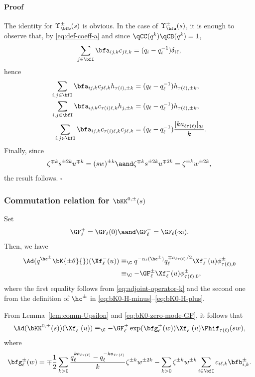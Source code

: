 \documentclass[reqno]{amsart}
\numberwithin{equation}{section}
\newenvironment{pf}{\medskip\paragraph{{\sc Proof}}}{\hfill$\square$\par\medskip}
\begin{document}
\begin{pf}
The identity for $\Upsilon_{\bfb}^\pm(s)$ is obvious. In the case of $\Upsilon_{\bfa}^\pm(s)$, 
it is enough to observe that, by \eqref{eq:def-coeff-a} and since $\qCC(q^k)\qCB(q^k)=1$, 
\begin{equation}\label{eq:basic-contraction-a-c}
\sum_{j\in\bfI}\bfa_{ij,k}c_{j\ell,k}
=(q_i-q_i^{-1})\delta_{i\ell},
\end{equation}
hence
\begin{align}
\sum_{i,j\in\bfI}
\bfa_{ij,k}c_{j\ell,k}h_{\tau(i),\pm k}
&=(q_\ell-q_\ell^{-1})h_{\tau(\ell),\pm k},
\label{eq:contraction-a-c-1}\\
\sum_{i,j\in\bfI}
\bfa_{ij,k}c_{\tau(i)\ell,k}h_{j,\pm k}
&=(q_\ell-q_\ell^{-1})h_{\tau(\ell),\pm k},
\label{eq:contraction-a-c-2}\\
\sum_{i,j\in\bfI}
\bfa_{ij,k}c_{\tau(i)\ell,k}c_{j\ell,k}
&=
(q_\ell-q_\ell^{-1})\frac{[ka_{\ell\tau(\ell)}]_{q_\ell}}{k}.
\label{eq:contraction-a-c-3}
\end{align}
Finally, since 
\[\zeta^{\mp k}s^{\pm 2k}u^{\mp k}
=(sw)^{\pm k}\aand\zeta^{\mp k}s^{\pm2k}u^{\mp2k}
=\zeta^{\pm k}w^{\pm 2k},\] 
the result follows.
\end{pf}

\subsubsection{Commutation relation for $\bKK^{0,\pm}(s)$}\label{sss:bK0-int-4}
Set
\[
\GF_\ell^+=\GF_\ell(0)\aand \GF_\ell^-=\GF_\ell(\infty).
\]
Then, we have
\begin{equation}\label{eq:bK0-zero-mode-GF}
\begin{aligned}
\Ad(q^{\hc^\pm}\bK{\pm\theta}{})
(\Xf^-_\ell(u))
&\equiv_{\C}
q^{-\alpha_\ell(\hc^\pm)}
q_\ell^{\mp a_{\ell\tau(\ell)}/2}
\Xf^-_\ell(u)\phi^\pm_{\tau(\ell),0}\\
&\equiv_{\C}
-\GF_\ell^\pm\Xf^-_\ell(u)\phi^\pm_{\tau(\ell),0},
\end{aligned}
\end{equation}
where the first equality follows from \eqref{eq:adjoint-operator-k} and the second one from the definition of $\hc^\pm$ in \eqref{eq:bK0-H-minus}--\eqref{eq:bK0-H-plus}.

From Lemma~\ref{lem:comm-Upsilon} and \eqref{eq:bK0-zero-mode-GF}, it follows that
\begin{equation}\label{eq:adjoint-K-partial}
\Ad(\bKK^{0,\pm}(s))(\Xf^-_\ell(u))
\equiv_\C
-\GF_{\ell}^{\pm}
\exp(\bfg_\ell^\pm(w))
\Xf^-_\ell(u)\Phif_{\tau(\ell)}(sw),
\end{equation}
where
\begin{equation}\label{eq:def-G-bK}
\bfg_\ell^\pm(w)
=
\mp\frac{1}{2}
\sum_{k>0}
\frac{q_\ell^{ka_{\ell\tau(\ell)}}
-q_\ell^{-ka_{\ell\tau(\ell)}}}{k}
\zeta^{\pm k}w^{\pm2 k}
-
\sum_{k>0}\zeta^{\pm k}w^{\pm k}
\sum_{i\in\bfI}c_{i\ell,k}\bfb_{i,k}^\pm.
\end{equation}
\end{document}
